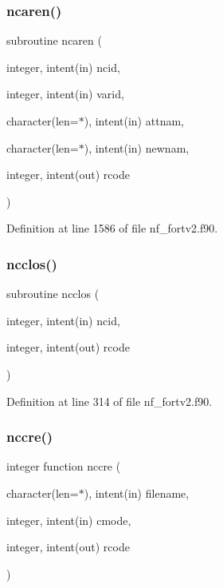 \subsubsection{\texorpdfstring{ncaren()}{ncaren()}}
{\footnotesize\ttfamily subroutine ncaren (\begin{DoxyParamCaption}\item[{integer, intent(in)}]{ncid,  }\item[{integer, intent(in)}]{varid,  }\item[{character(len=$\ast$), intent(in)}]{attnam,  }\item[{character(len=$\ast$), intent(in)}]{newnam,  }\item[{integer, intent(out)}]{rcode }\end{DoxyParamCaption})}



Definition at line 1586 of file nf\+\_\+fortv2.\+f90.

\mbox{\label{nf__fortv2_8f90_a03f16672189e09514f5df0a9d72e6859}} 
\subsubsection{\texorpdfstring{ncclos()}{ncclos()}}
{\footnotesize\ttfamily subroutine ncclos (\begin{DoxyParamCaption}\item[{integer, intent(in)}]{ncid,  }\item[{integer, intent(out)}]{rcode }\end{DoxyParamCaption})}



Definition at line 314 of file nf\+\_\+fortv2.\+f90.

\mbox{\label{nf__fortv2_8f90_a395384eea56bdad4a53b55df6d6e78d2}} 
\subsubsection{\texorpdfstring{nccre()}{nccre()}}
{\footnotesize\ttfamily integer function nccre (\begin{DoxyParamCaption}\item[{character(len=$\ast$), intent(in)}]{filename,  }\item[{integer, intent(in)}]{cmode,  }\item[{integer, intent(out)}]{rcode }\end{DoxyParamCaption})}



